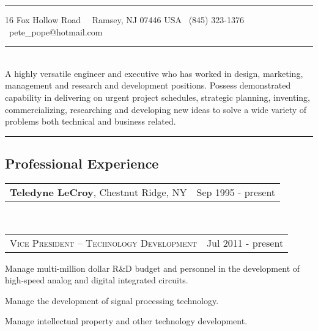 \documentclass[10pt,letterpaper]{extarticle}
\makeatletter
\newcommand{\headerrow}[2]
{\begin{tabular*}{\linewidth}{l@{\extracolsep{\fill}}r}
	#1 &
	#2 \\
\end{tabular*}}
\makeatother
\begin{document}
\begin{center}
\vspace{2em}
\hrule
\vspace{0.4em}
16 Fox Hollow Road\ \textbullet
\ Ramsey, NJ  07446 USA \textbullet
\ (845) 323-1376 \textbullet
\ pete\_pope@hotmail.com
\end{center}
\vspace{-0.5em}
\hrule
\vspace{-0.6em}
\\
{
A highly versatile engineer and executive who has worked in design, marketing, management and  research and development positions.  Possess demonstrated capability in delivering on urgent project schedules, strategic planning,  inventing, commercializing,  researching and developing new ideas to solve a wide variety of problems both technical and business related.}
\vspace{0.4em}\hrule
\vspace{-1em}\subsection*{\Large Professional Experience}\vspace{-0.5em}
	\headerrow
		{\large \textbf{Teledyne LeCroy}, Chestnut Ridge, NY}
		{Sep 1995 - present}
	\\
	\headerrow
		{\large \textsc{Vice President – Technology Development}}
		{Jul 2011 - present}\vspace{-\topsep}\begin{itemize*}
		\item Manage multi-million dollar R\&D budget and personnel in the development of high-speed analog and digital integrated circuits.
		\item Manage the development of signal processing technology.
		\item Manage intellectual property and other technology development.
	\end{itemize*}\vspace{-\topsep}
\end{document}
